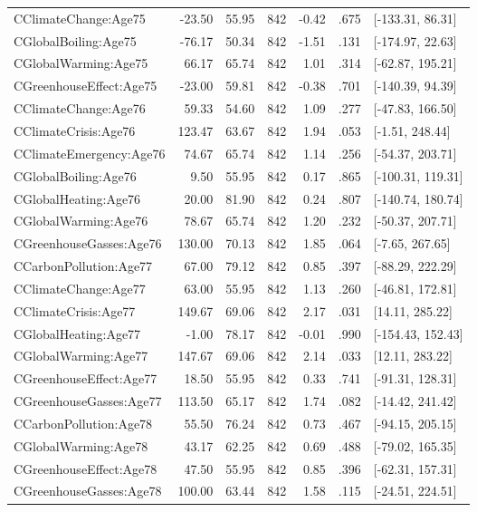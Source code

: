 \begin{table}[ht]
\begin{tabular}{lrrrrrl}
  CClimateChange:Age75 & -23.50 & 55.95 & 842 & -0.42 & .675 & [-133.31, 86.31] \\ 
  CGlobalBoiling:Age75 & -76.17 & 50.34 & 842 & -1.51 & .131 & [-174.97, 22.63] \\ 
  CGlobalWarming:Age75 & 66.17 & 65.74 & 842 & 1.01 & .314 & [-62.87, 195.21] \\ 
  CGreenhouseEffect:Age75 & -23.00 & 59.81 & 842 & -0.38 & .701 & [-140.39, 94.39] \\ 
  CClimateChange:Age76 & 59.33 & 54.60 & 842 & 1.09 & .277 & [-47.83, 166.50] \\ 
  CClimateCrisis:Age76 & 123.47 & 63.67 & 842 & 1.94 & .053 & [-1.51, 248.44] \\ 
  CClimateEmergency:Age76 & 74.67 & 65.74 & 842 & 1.14 & .256 & [-54.37, 203.71] \\ 
  CGlobalBoiling:Age76 & 9.50 & 55.95 & 842 & 0.17 & .865 & [-100.31, 119.31] \\ 
  CGlobalHeating:Age76 & 20.00 & 81.90 & 842 & 0.24 & .807 & [-140.74, 180.74] \\ 
  CGlobalWarming:Age76 & 78.67 & 65.74 & 842 & 1.20 & .232 & [-50.37, 207.71] \\ 
  CGreenhouseGasses:Age76 & 130.00 & 70.13 & 842 & 1.85 & .064 & [-7.65, 267.65] \\ 
  CCarbonPollution:Age77 & 67.00 & 79.12 & 842 & 0.85 & .397 & [-88.29, 222.29] \\ 
  CClimateChange:Age77 & 63.00 & 55.95 & 842 & 1.13 & .260 & [-46.81, 172.81] \\ 
  CClimateCrisis:Age77 & 149.67 & 69.06 & 842 & 2.17 & .031 & [14.11, 285.22] \\ 
  CGlobalHeating:Age77 & -1.00 & 78.17 & 842 & -0.01 & .990 & [-154.43, 152.43] \\ 
  CGlobalWarming:Age77 & 147.67 & 69.06 & 842 & 2.14 & .033 & [12.11, 283.22] \\ 
  CGreenhouseEffect:Age77 & 18.50 & 55.95 & 842 & 0.33 & .741 & [-91.31, 128.31] \\ 
  CGreenhouseGasses:Age77 & 113.50 & 65.17 & 842 & 1.74 & .082 & [-14.42, 241.42] \\ 
  CCarbonPollution:Age78 & 55.50 & 76.24 & 842 & 0.73 & .467 & [-94.15, 205.15] \\ 
  CGlobalWarming:Age78 & 43.17 & 62.25 & 842 & 0.69 & .488 & [-79.02, 165.35] \\ 
  CGreenhouseEffect:Age78 & 47.50 & 55.95 & 842 & 0.85 & .396 & [-62.31, 157.31] \\ 
  CGreenhouseGasses:Age78 & 100.00 & 63.44 & 842 & 1.58 & .115 & [-24.51, 224.51] \\ 

\end{tabular}
\end{table}
